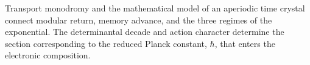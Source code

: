 Transport monodromy and the mathematical model of an aperiodic time
crystal connect modular return, memory advance, and the three regimes
of the exponential. The determinantal decade and action character
determine the section corresponding to the reduced Planck constant,
\(\hbar\), that enters the electronic composition.
